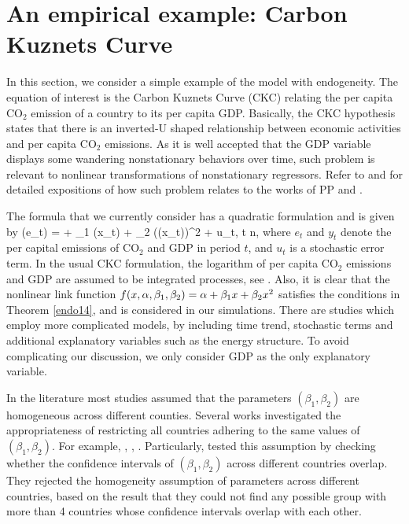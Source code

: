 
\section{An empirical example: Carbon Kuznets Curve} 

In this section, we consider a simple example of the model with endogeneity. The equation of interest is the Carbon Kuznets Curve (CKC) relating the per capita CO$_2$ emission of a country to its per capita GDP. Basically, the CKC hypothesis states that there is an inverted-U shaped relationship between economic activities and per capita CO$_2$ emissions. As it is well accepted that the GDP variable displays some wandering nonstationary behaviors over time, such problem is relevant to nonlinear transformations of nonstationary regressors. Refer to \cite{wagner2008} and \cite{mullerwagner2007} for detailed expositions of how such problem relates to the works of PP and \cite{changparkphillips2001}.

The formula that we currently consider has a quadratic formulation and is given by
\be {}
\ln(e_{t}) = \al + \beta_1 \ln(x_t) + \beta_2 (\ln(x_t))^2 + u_t,  \le t \le n,
\ee
where $e_t$ and $y_t$ denote the per capital emissions of CO$_2$ and GDP in period $t$, and $u_t$ is a stochastic error term. In the usual CKC formulation, the logarithm of per capita CO$_2$ emissions and GDP are assumed to be integrated processes, see \cite{mullerwagner2007}. Also, it is clear that the nonlinear link function $f(x, \alpha, \beta_1, \beta_2) = \alpha + \beta_1 x + \beta_2 x^2$ satisfies the conditions in Theorem \ref{endo14}, and is considered in our simulations. There are studies which employ more complicated models, by including time trend, stochastic terms and additional explanatory variables such as the energy structure. To avoid complicating our discussion, we only consider GDP as the only explanatory variable.

In the literature most studies assumed that the parameters $(\beta_1, \beta_2)$ are homogeneous across different counties. Several works investigated the appropriateness of restricting all countries adhering to the same values of $(\beta_1, \beta_2)$. For example, \cite{listgallet1999}, \cite{dijkgraafvollebergh2005}, \cite{piaggiopadilla2010}. Particularly, \cite{piaggiopadilla2010} tested this assumption by checking whether the confidence intervals of $(\beta_1, \beta_{2})$ across different countries overlap. They rejected the homogeneity assumption of parameters across different countries, based on the result that they could not find any possible group with more than 4 countries whose confidence intervals overlap with each other.

